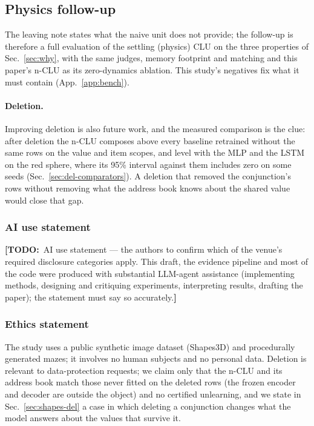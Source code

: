 \documentclass{article} %
\newcommand{\TODO}[1]{{\color{orange}\textbf{[TODO:}~#1\textbf{]}}}
\begin{document}
\subsection{Physics follow-up}
\label{sec:followup}

The leaving note states what the naive unit does not provide; the follow-up is therefore a full evaluation of the settling (physics) CLU on the three properties of Sec.~\ref{sec:why}, with the same judges, memory footprint and matching and this paper's n-CLU as its zero-dynamics ablation. This study's negatives fix what it must contain (App.~\ref{app:bench}).

\paragraph{Deletion.} Improving deletion is also future work, and the measured comparison is
the clue: after deletion the n-CLU composes above every baseline retrained without the same rows on
the value and item scopes, and level with the MLP and the LSTM on the red sphere, where its 95\% %
interval against them includes zero on some seeds (Sec.~\ref{sec:del-comparators}). A deletion that
removed the conjunction's rows without removing what the address book knows about the shared value
would close that gap.

\subsubsection*{AI use statement}
\TODO{AI use statement --- the authors to confirm which of the venue's required disclosure categories
apply. This draft, the evidence pipeline and most of the code were produced with substantial LLM-agent
assistance (implementing methods, designing and critiquing experiments, interpreting results,
drafting the paper); the statement must say so accurately.}

\subsubsection*{Ethics statement}
The study uses a public synthetic image dataset (Shapes3D) and procedurally generated mazes; it
involves no human subjects and no personal data. Deletion is relevant to data-protection
requests; we claim only that the n-CLU and its address book match those never fitted on the deleted
rows (the frozen encoder and decoder are outside the object) and no certified unlearning, and
we state in Sec.~\ref{sec:shapes-del} a case in which deleting a conjunction changes what the
model answers about the values that survive it.
\end{document}
